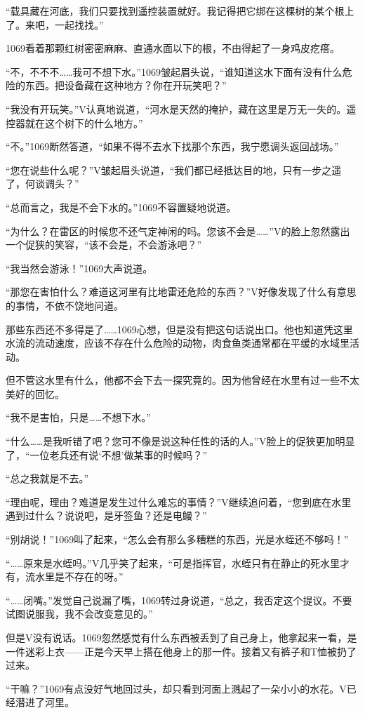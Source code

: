 “载具藏在河底，我们只要找到遥控装置就好。我记得把它绑在这棵树的某个根上了。来吧，一起找找。”

1069看着那颗红树密密麻麻、直通水面以下的根，不由得起了一身鸡皮疙瘩。

“不，不不不……我可不想下水。”1069皱起眉头说，“谁知道这水下面有没有什么危险的东西。把设备藏在这种地方？你在开玩笑吧？”

“我没有开玩笑。”V认真地说道，“河水是天然的掩护，藏在这里是万无一失的。遥控器就在这个树下的什么地方。”

“不。”1069断然答道，“如果不得不去水下找那个东西，我宁愿调头返回战场。”

“您在说些什么呢？”V皱起眉头说道，“我们都已经抵达目的地，只有一步之遥了，何谈调头？”

“总而言之，我是不会下水的。”1069不容置疑地说道。

“为什么？在雷区的时候您不还气定神闲的吗。您该不会是……”V的脸上忽然露出一个促狭的笑容，“该不会是，不会游泳吧？”

“我当然会游泳！”1069大声说道。

“那您在害怕什么？难道这河里有比地雷还危险的东西？”V好像发现了什么有意思的事情，不依不饶地问道。

那些东西还不多得是了……1069心想，但是没有把这句话说出口。他也知道凭这里水流的流动速度，应该不存在什么危险的动物，肉食鱼类通常都在平缓的水域里活动。

但不管这水里有什么，他都不会下去一探究竟的。因为他曾经在水里有过一些不太美好的回忆。

“我不是害怕，只是……不想下水。”

“什么……是我听错了吧？您可不像是说这种任性的话的人。”V脸上的促狭更加明显了，“一位老兵还有说‘不想’做某事的时候吗？”

“总之我就是不去。”

“理由呢，理由？难道是发生过什么难忘的事情？”V继续追问着，“您到底在水里遇到过什么？说说吧，是牙签鱼？还是电鳗？”

“别胡说！”1069叫了起来，“怎么会有那么多糟糕的东西，光是水蛭还不够吗！”

“……原来是水蛭吗。”V几乎笑了起来，“可是指挥官，水蛭只有在静止的死水里才有，流水里是不存在的呀。”

“……闭嘴。”发觉自己说漏了嘴，1069转过身说道，“总之，我否定这个提议。不要试图说服我，我不会改变意见的。”

但是V没有说话。1069忽然感觉有什么东西被丢到了自己身上，他拿起来一看，是一件迷彩上衣——正是今天早上搭在他身上的那一件。接着又有裤子和T恤被扔了过来。

“干嘛？”1069有点没好气地回过头，却只看到河面上溅起了一朵小小的水花。V已经潜进了河里。


